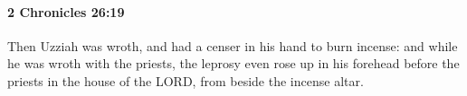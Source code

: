 
		\paragraph{2 Chronicles 26:19} %
			\label{2CHRONICLES-26-19}

			Then Uzziah was wroth, and had a censer in his hand to burn incense: and while he was wroth with the priests, the leprosy even rose up in his forehead before the priests in the house of the LORD, from beside the incense altar.


